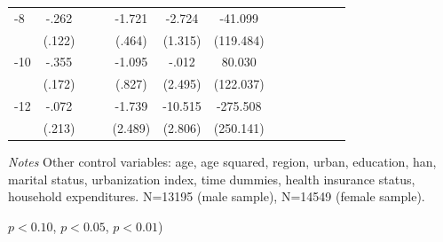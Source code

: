 \begin{table}[p]
\begin{adjustbox}{max width=\linewidth}
\begin{threeparttable}
{\begin{tabular}{l*{6}{S
S}}
-8             &    -.262\sym{**} &         &         &   -1.721\sym{***}&   -2.724\sym{**} &  -41.099         \\
                &   (.122)         &         &         &   (.464)         &  (1.315)         &(119.484)         \\
-10            &    -.355\sym{**} &         &         &   -1.095         &    -.012         &   80.030         \\
                &   (.172)         &         &         &   (.827)         &  (2.495)         &(122.037)         \\
-12           &    -.072         &         &         &   -1.739         &  -10.515\sym{***}& -275.508         \\
                &   (.213)         &         &         &  (2.489)         &  (2.806)         &(250.141)         \\
\bottomrule
\end{tabular}
\begin{tablenotes}
\item \textit{Notes} Other control variables: age, age squared, region, urban, education, han, marital status, urbanization index, time dummies, health insurance status, household expenditures. N=13195 (male sample), N=14549 (female sample).
\item \sym{*} \(p<0.10\), \sym{**} \(p<0.05\), \sym{***} \(p<0.01\))
\end{tablenotes}
}
\end{threeparttable}
\end{adjustbox}
\end{table}
\clearpage

